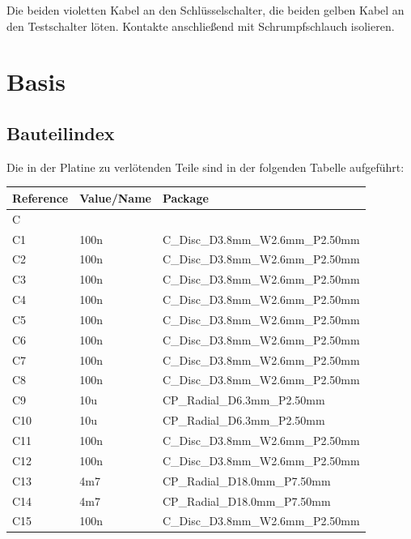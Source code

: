 \documentclass[paper=a4, open=any]{scrbook}
\begin{document}
				Die beiden violetten Kabel an den Schlüsselschalter, die beiden gelben Kabel an den Testschalter löten. Kontakte anschließend mit Schrumpfschlauch isolieren.

				\newpage
		\section{Basis}
			\subsection*{Bauteilindex}

				Die in der Platine zu verlötenden Teile sind in der folgenden Tabelle aufgeführt:

				\begin{longtabu}
					to \textwidth[l]{lX[-1]X}
					Reference & Value/Name             & Package                                                 \\ \hline\hline
					\endhead
					C         &                        &                                                         \\*
					C1        & 100n                   & C\_Disc\_D3.8mm\_W2.6mm\_P2.50mm                        \\
					C2        & 100n                   & C\_Disc\_D3.8mm\_W2.6mm\_P2.50mm                        \\
					C3        & 100n                   & C\_Disc\_D3.8mm\_W2.6mm\_P2.50mm                        \\
					C4        & 100n                   & C\_Disc\_D3.8mm\_W2.6mm\_P2.50mm                        \\
					C5        & 100n                   & C\_Disc\_D3.8mm\_W2.6mm\_P2.50mm                        \\
					C6        & 100n                   & C\_Disc\_D3.8mm\_W2.6mm\_P2.50mm                        \\
					C7        & 100n                   & C\_Disc\_D3.8mm\_W2.6mm\_P2.50mm                        \\
					C8        & 100n                   & C\_Disc\_D3.8mm\_W2.6mm\_P2.50mm                        \\
					C9        & 10u                    & CP\_Radial\_D6.3mm\_P2.50mm                             \\
					C10       & 10u                    & CP\_Radial\_D6.3mm\_P2.50mm                             \\
					C11       & 100n                   & C\_Disc\_D3.8mm\_W2.6mm\_P2.50mm                        \\
					C12       & 100n                   & C\_Disc\_D3.8mm\_W2.6mm\_P2.50mm                        \\
					C13       & 4m7                    & CP\_Radial\_D18.0mm\_P7.50mm                            \\
					C14       & 4m7                    & CP\_Radial\_D18.0mm\_P7.50mm                            \\
					C15       & 100n                   & C\_Disc\_D3.8mm\_W2.6mm\_P2.50mm                        \\
					\hline


\end{longtabu}
\end{document}
